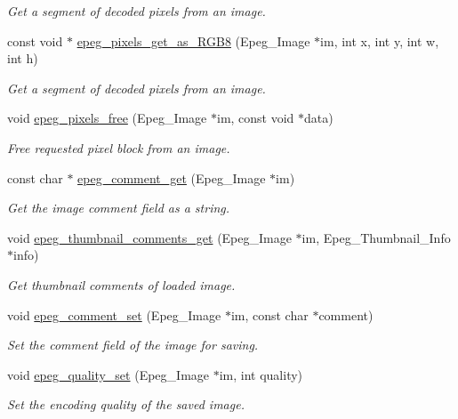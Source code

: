 \begin{DoxyCompactItemize}
\begin{DoxyCompactList}\small\item\em Get a segment of decoded pixels from an image. \end{DoxyCompactList}\item 
const void $\ast$ \hyperlink{epeg_8c_a2dee06509f945c8e56efe30975e77806}{epeg\+\_\+pixels\+\_\+get\+\_\+as\+\_\+\+R\+G\+B8} (Epeg\+\_\+\+Image $\ast$im, int x, int y, int w, int h)
\begin{DoxyCompactList}\small\item\em Get a segment of decoded pixels from an image. \end{DoxyCompactList}\item 
void \hyperlink{epeg_8c_adf9efc5d877afebda99aba8d5c2bbb0f}{epeg\+\_\+pixels\+\_\+free} (Epeg\+\_\+\+Image $\ast$im, const void $\ast$data)
\begin{DoxyCompactList}\small\item\em Free requested pixel block from an image. \end{DoxyCompactList}\item 
const char $\ast$ \hyperlink{epeg_8c_ab4aea6482399797f2f4ada02e9962b7f}{epeg\+\_\+comment\+\_\+get} (Epeg\+\_\+\+Image $\ast$im)
\begin{DoxyCompactList}\small\item\em Get the image comment field as a string. \end{DoxyCompactList}\item 
void \hyperlink{epeg_8c_a28e230b7b3bb05b8a470c80c45100c52}{epeg\+\_\+thumbnail\+\_\+comments\+\_\+get} (Epeg\+\_\+\+Image $\ast$im, Epeg\+\_\+\+Thumbnail\+\_\+\+Info $\ast$info)
\begin{DoxyCompactList}\small\item\em Get thumbnail comments of loaded image. \end{DoxyCompactList}\item 
void \hyperlink{epeg_8c_ab96605b1c21ec8d791df705a5117233c}{epeg\+\_\+comment\+\_\+set} (Epeg\+\_\+\+Image $\ast$im, const char $\ast$comment)
\begin{DoxyCompactList}\small\item\em Set the comment field of the image for saving. \end{DoxyCompactList}\item 
void \hyperlink{epeg_8c_ad0c11f61561f622ca4097c47c75129bc}{epeg\+\_\+quality\+\_\+set} (Epeg\+\_\+\+Image $\ast$im, int quality)
\begin{DoxyCompactList}\small\item\em Set the encoding quality of the saved image. \end{DoxyCompactList}\item 

\end{DoxyCompactItemize}

